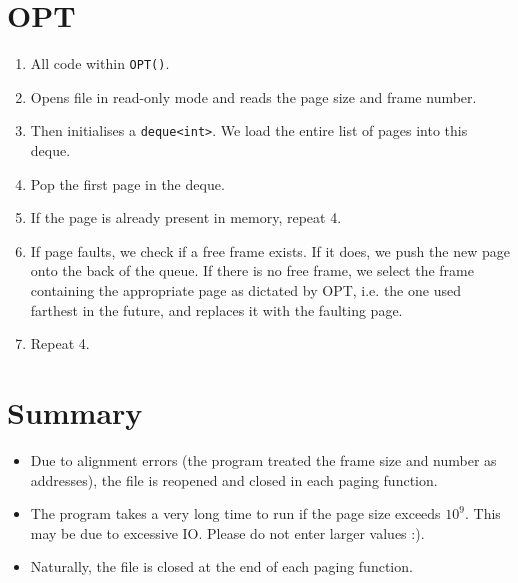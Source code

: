 \documentclass{amsart}
\begin{document}
    \section{OPT}
     \begin{enumerate}
        \item All code within \texttt{OPT()}.
        \item Opens file in read-only mode and reads the page size and frame number. 
        \item Then initialises a \texttt{deque<int>}. We load the entire list of pages into this deque.
        \item Pop the first page in the deque.
        \item If the page is already present in memory, repeat 4.
        \item If page faults, we check if a free frame exists. If it does, we push the new page onto the back of the queue. If there is no free frame, we select the frame containing the appropriate page as dictated by OPT, i.e. the one used farthest in the future, and replaces it with the faulting page.
        \item Repeat 4.
    \end{enumerate}

    \section{Summary} 
    \begin{itemize}
        \item Due to alignment errors (the program treated the frame size and number as addresses), the file is reopened and closed in each paging function.
        \item The program takes a very long time to run if the page size exceeds \(10^9\). This may be due to excessive IO. Please do not enter larger values :).
        \item Naturally, the file is closed at the end of each paging function.
    \end{itemize}
\end{document}
